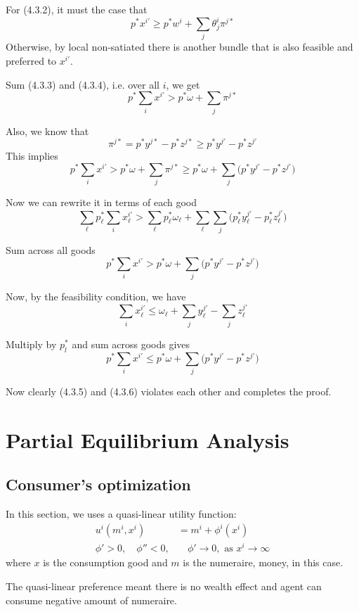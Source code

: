 \documentclass[twocolumn, fleqn]{article}
\begin{document}
		For (4.3.2), it must the case that 
		\[p^\ast x^{i'} \geq p^\ast w^{i} +\sum_j \theta_j^{i} \pi^{j\ast}\tag{4.3.4}\]
		Otherwise, by local non-satiated there is another bundle that is also feasible and preferred to $x^{i'}$.
		
		Sum (4.3.3) and (4.3.4), i.e. over all $i$, we get 
		\[
		p^* \sum_i x^{i'} > p^* \omega + \sum_j \pi^{j*}\]
		
		Also, we know that 
		\[
		\pi^{j*} = p^* y^{j*} - p^* z^{j*} \geq p^* y^{j'} - p^* z^{j'}
		\]
		This implies 
		\[
		p^* \sum_i x^{i'} > p^* \omega + \sum_j \pi^{j*} \geq p^* \omega + \sum_j \big(p^* y^{j'} - p^* z^{j'}\big)
		\]
		
		Now we can rewrite it in terms of each good 
		\[
		\sum_{\ell} p^*_{\ell} \sum_i x^{i'}_{\ell} > \sum_{\ell} p^*_{\ell} \omega_{\ell} + \sum_{\ell} \sum_j \big(p^*_{\ell} y^{j'}_{\ell} - p^*_{\ell} z^{j'}_{\ell}\big)
		\]
		
		Sum across all goods 
		\[
		p^* \sum_i x^{i'} > p^* \omega + \sum_j \big(p^* y^{j'} - p^* z^{j'}\big) \tag{4.3.5}
		\]
		
		
		Now, by the feasibility condition, we have 
		\[
		\sum_i x^{i'}_{\ell} \leq \omega_{\ell} + \sum_j y^{j'}_{\ell} - \sum_j z^{j'}_{\ell}
		\]
		
		Multiply by $p^\ast_l$ and sum across goods gives
		\[
		p^* \sum_i x^{i'} \leq p^* \omega + \sum_j \big(p^* y^{j'} - p^* z^{j'}\big) \tag{4.3.6}
		\]
		
		Now clearly (4.3.5) and (4.3.6) violates each other and completes the proof.
		
		\section{Partial Equilibrium Analysis}
		\subsection{Consumer's optimization}
		In this section, we uses a quasi-linear utility function:
		\begin{align*}
			u^i(m^i,x^i)&=m^i + \phi^i (x^i)\\
			\phi' >0,  \quad \phi''<0, &\quad \phi' \rightarrow 0, \text{ as } x^i \rightarrow \infty
		\end{align*}		
		where $x$ is the consumption good and $m$ is the numeraire, money, in this case.
		
		The quasi-linear preference meant there is no wealth effect and agent can consume negative amount of numeraire. 
		
\end{document}
